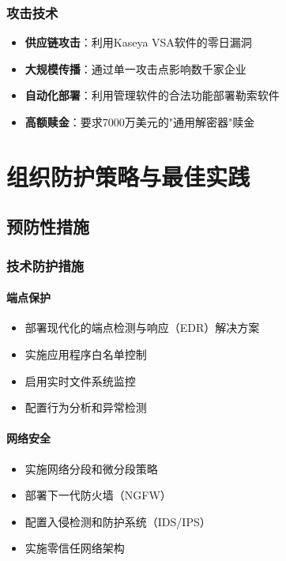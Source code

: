 \documentclass[12pt,a4paper]{article}
\begin{document}
\subsubsection{攻击技术}
\begin{itemize}
    \item \textbf{供应链攻击}：利用Kaseya VSA软件的零日漏洞
    \item \textbf{大规模传播}：通过单一攻击点影响数千家企业
    \item \textbf{自动化部署}：利用管理软件的合法功能部署勒索软件
    \item \textbf{高额赎金}：要求7000万美元的"通用解密器"赎金
\end{itemize}

\section{组织防护策略与最佳实践}

\subsection{预防性措施}

\subsubsection{技术防护措施}

\paragraph{端点保护}
\begin{itemize}
    \item 部署现代化的端点检测与响应（EDR）解决方案
    \item 实施应用程序白名单控制
    \item 启用实时文件系统监控
    \item 配置行为分析和异常检测
\end{itemize}

\paragraph{网络安全}
\begin{itemize}
    \item 实施网络分段和微分段策略
    \item 部署下一代防火墙（NGFW）
    \item 配置入侵检测和防护系统（IDS/IPS）
    \item 实施零信任网络架构
\end{itemize}
\end{document}
